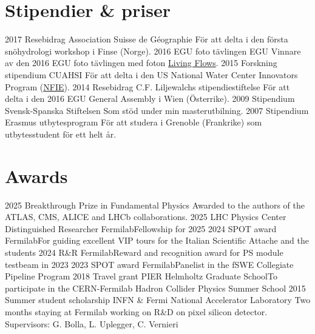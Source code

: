 \ifswedish
  \section{Stipendier \& priser}
    \position
      {2017}
      {Resebidrag}
      {Association Suisse de Géographie}
      {För att delta i den första snöhydrologi workshop i Finse (Norge).}
    \position
      {2016}
      {EGU foto tävlingen}
      {EGU}
      {Vinnare av den 2016 EGU foto tävlingen med foton \href{https://blogs.egu.eu/geolog/2016/08/29/imaggeo-on-mondays-living-flows/}{Living Flows}.}
    \position
      {2015}
      {Forskning stipendium}
      {CUAHSI}
      {För att delta i den US National Water Center Innovators Program  (\href{https://www.cuahsi.org/education/summerinstitute/}{NFIE}).}
    \position
      {2014}
      {Resebidrag}
      {C.F. Liljewalchs stipendiestiftelse}
      {För att delta i den 2016 EGU General Assembly i Wien (Österrike).}
    \position
      {2009}
      {Stipendium}
      {Svensk-Spanska Stiftelsen}
      {Som stöd under min masterutbilning.}
    \position
      {2007}
      {Stipendium}
      {Erasmus utbytesprogram}
      {För att studera i Grenoble (Frankrike) som utbytesstudent för ett helt år.}
\else
  \section{Awards}
    \ifacademic
    \position  
        {2025}
        {Breakthrough Prize in Fundamental Physics}
        {}{Awarded to the authors of the ATLAS, CMS, ALICE and LHCb collaborations.} 
    \position  
        {2025}
        {LHC Physics Center Distinguished Researcher}
        {Fermilab}{Fellowship for 2025} 
    \position  
        {2024}
        {SPOT award}
        {Fermilab}{For guiding excellent VIP tours for the Italian Scientific Attache and the students} 
     \position  
        {2024}
        {R\&R}
        {Fermilab}{Reward and recognition award for PS module testbeam in 2023} 
      \position  
        {2023}
        {SPOT award}
        {Fermilab}{Panelist in the fSWE Collegiate Pipeline Program} 
      \position  
        {2018}
        {Travel grant}
        {PIER Helmholtz Graduate School}{To participate in the CERN-Fermilab Hadron Collider Physics Summer School}      
       \position
        {2015}
        {Summer student scholarship}
        {INFN \& Fermi National Accelerator Laboratory} 
        {Two months staying at Fermilab working on R\&D on pixel silicon detector. \newline Supervisors: G. Bolla, L. Uplegger, C. Vernieri}
    \fi
\fi
